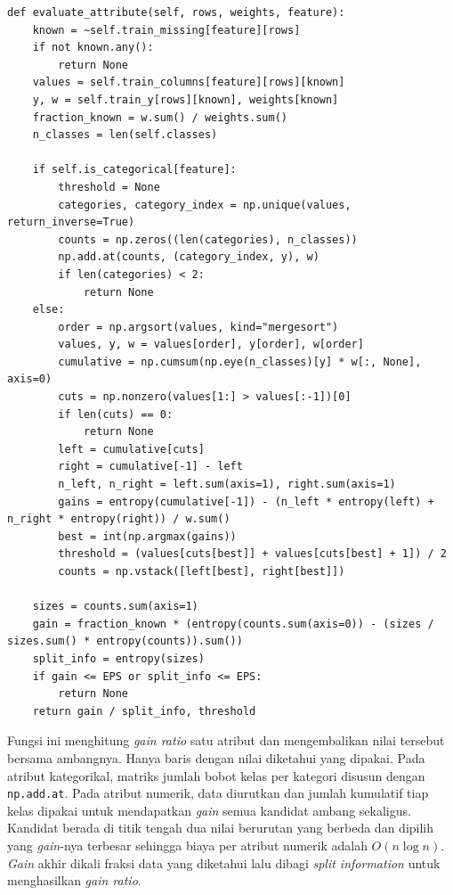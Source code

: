 \begin{lstlisting}
def evaluate_attribute(self, rows, weights, feature):
    known = ~self.train_missing[feature][rows]
    if not known.any():
        return None
    values = self.train_columns[feature][rows][known]
    y, w = self.train_y[rows][known], weights[known]
    fraction_known = w.sum() / weights.sum()
    n_classes = len(self.classes)

    if self.is_categorical[feature]:
        threshold = None
        categories, category_index = np.unique(values, return_inverse=True)
        counts = np.zeros((len(categories), n_classes))
        np.add.at(counts, (category_index, y), w)
        if len(categories) < 2:
            return None
    else:
        order = np.argsort(values, kind="mergesort")
        values, y, w = values[order], y[order], w[order]
        cumulative = np.cumsum(np.eye(n_classes)[y] * w[:, None], axis=0)
        cuts = np.nonzero(values[1:] > values[:-1])[0]
        if len(cuts) == 0:
            return None
        left = cumulative[cuts]
        right = cumulative[-1] - left
        n_left, n_right = left.sum(axis=1), right.sum(axis=1)
        gains = entropy(cumulative[-1]) - (n_left * entropy(left) + n_right * entropy(right)) / w.sum()
        best = int(np.argmax(gains))
        threshold = (values[cuts[best]] + values[cuts[best] + 1]) / 2
        counts = np.vstack([left[best], right[best]])

    sizes = counts.sum(axis=1)
    gain = fraction_known * (entropy(counts.sum(axis=0)) - (sizes / sizes.sum() * entropy(counts)).sum())
    split_info = entropy(sizes)
    if gain <= EPS or split_info <= EPS:
        return None
    return gain / split_info, threshold
\end{lstlisting}

Fungsi ini menghitung \textit{gain ratio} satu atribut dan mengembalikan nilai
tersebut bersama ambangnya. Hanya baris dengan nilai diketahui yang dipakai.
Pada atribut kategorikal, matriks jumlah bobot kelas per kategori disusun
dengan \texttt{np.add.at}. Pada atribut numerik, data diurutkan dan jumlah
kumulatif tiap kelas dipakai untuk mendapatkan \textit{gain} semua kandidat
ambang sekaligus. Kandidat berada di titik tengah dua nilai berurutan yang
berbeda dan dipilih yang \textit{gain}-nya terbesar sehingga biaya per atribut
numerik adalah $O(n\log n)$. \textit{Gain} akhir dikali fraksi data yang
diketahui lalu dibagi \textit{split information} untuk menghasilkan
\textit{gain ratio}.

